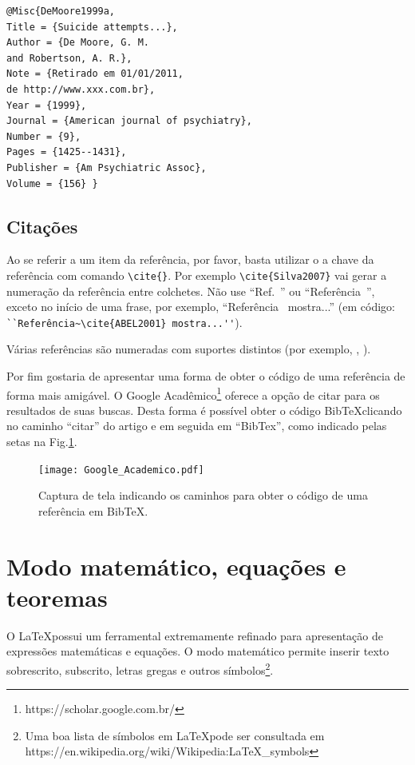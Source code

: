 \documentclass{RBClatex}
\begin{document}
\begin{lstlisting}
@Misc{DeMoore1999a,
Title = {Suicide attempts...},
Author = {De Moore, G. M. 
and Robertson, A. R.},
Note = {Retirado em 01/01/2011, 
de http://www.xxx.com.br},
Year = {1999},
Journal = {American journal of psychiatry},
Number = {9},
Pages = {1425--1431},
Publisher = {Am Psychiatric Assoc},
Volume = {156} }
\end{lstlisting}

\subsection{Citações}

Ao se referir a um item da referência, por favor, basta utilizar o a chave da referência com comando \verb|\cite{}|. Por exemplo \verb|\cite{Silva2007}| vai gerar a numeração da referência entre colchetes. Não use ``Ref.~\cite{ABEL2001}'' ou ``Referência~\cite{ABEL2001}'', exceto no início de uma frase, por exemplo, ``Referência~\cite{ABEL2001} mostra...'' (em código: \verb|``Referência~\cite{ABEL2001} mostra...''|). 

Várias referências são numeradas com suportes distintos (por exemplo, \cite{Silva2007}, \cite{Pires2005, Fricke1990,Dias2011}). 

Por fim gostaria de apresentar uma forma de obter o código de uma referência de forma mais amigável. O Google Acadêmico\footnote{https://scholar.google.com.br/} oferece a opção de citar para os resultados de suas buscas. Desta forma é possível obter o código Bib\TeX clicando no caminho ``citar'' do artigo e em seguida em ``BibTex'', como indicado pelas setas na Fig.\ref{Fig:Google_Academico}.

\begin{figure}[h]
	\centering
	\texttt{[image: Google\_Academico.pdf]}
	\caption{Captura de tela indicando os caminhos para obter o código de uma referência em Bib\TeX.}
	\label{Fig:Google_Academico}
\end{figure} 

\section{Modo matemático, equações e teoremas}

O \LaTeX possui um ferramental extremamente refinado para apresentação de expressões matemáticas e equações. O modo matemático permite inserir texto sobrescrito, subscrito, letras gregas e outros símbolos\footnote{Uma boa lista de símbolos em \LaTeX pode ser consultada em https://en.wikipedia.org/wiki/Wikipedia:LaTeX\_symbols}. 
\end{document}
